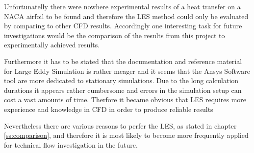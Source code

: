 Unfortunatelly there were nowhere experimental results of a heat transfer on a NACA airfoil to be found and therefore the LES method could only be evaluated by comparing to other CFD results.
Accordingly one interesting task for future investigations would be the comparison of the results from this project to experimentally achieved results.

Furthermore it has to be stated that the documentation and reference material for Large Eddy Simulation is rather meager and it seems that the Ansys Software tool are more dedicated to stationary simulations. Due to the long calculation durations it appears rather cumbersome and errors in the simulation setup can cost a vast amounts of time. Therfore it became obvious that LES requires more experience and knowledge in CFD in order to produce reliable results

Nevertheless there are various reasons to perfer the LES, as stated in chapter \ref{ss:comparison}, and therefore it is most likely to become more frequently applied for technical flow investigation in the future.
